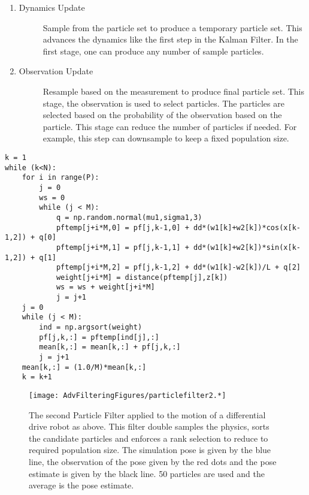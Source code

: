 \begin{enumerate}
\def\labelenumi{\arabic{enumi}.}
\item
  \begin{description}
  \item[Dynamics Update]
  Sample from the particle set to produce a temporary particle set. This
  advances the dynamics like the first step in the Kalman Filter. In the
  first stage, one can produce any number of sample particles.
  \end{description}
\item
  \begin{description}
  \item[Observation Update]
  Resample based on the measurement to produce final particle set. This
  stage, the observation is used to select particles. The particles are
  selected based on the probability of the observation based on the
  particle. This stage can reduce the number of particles if needed. For
  example, this step can downsample to keep a fixed population size.
  \end{description}
\end{enumerate}

\begin{verbatim}
k = 1
while (k<N):
    for i in range(P):
        j = 0
        ws = 0
        while (j < M):
            q = np.random.normal(mu1,sigma1,3)
            pftemp[j+i*M,0] = pf[j,k-1,0] + dd*(w1[k]+w2[k])*cos(x[k-1,2]) + q[0]
            pftemp[j+i*M,1] = pf[j,k-1,1] + dd*(w1[k]+w2[k])*sin(x[k-1,2]) + q[1]
            pftemp[j+i*M,2] = pf[j,k-1,2] + dd*(w1[k]-w2[k])/L + q[2]
            weight[j+i*M] = distance(pftemp[j],z[k])
            ws = ws + weight[j+i*M]
            j = j+1
    j = 0
    while (j < M):
        ind = np.argsort(weight)
        pf[j,k,:] = pftemp[ind[j],:]
        mean[k,:] = mean[k,:] + pf[j,k,:]
        j = j+1
    mean[k,:] = (1.0/M)*mean[k,:]
    k = k+1
\end{verbatim}

\begin{figure}
\centering
\texttt{[image: AdvFilteringFigures/particlefilter2.*]}
\caption{The second Particle Filter applied to the motion of a
differential drive robot as above. This filter double samples the
physics, sorts the candidate particles and enforces a rank selection to
reduce to required population size. The simulation pose is given by the
blue line, the observation of the pose given by the red dots and the
pose estimate is given by the black line. 50 particles are used and the
average is the pose estimate.}
\end{figure}

